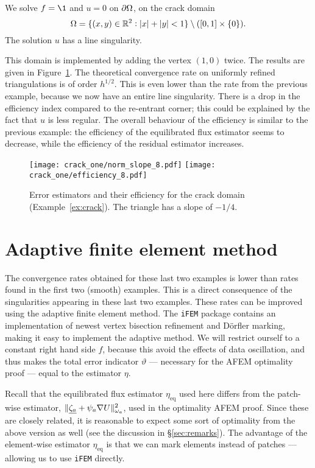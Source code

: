 \documentclass[thesis.tex]{subfiles}
\begin{document}
\begin{exmp}
  \label{ex:crack}
  We solve $f = \1$ and $u = 0$ on $\partial \Omega$, on the crack domain
  \[
  \Omega=\{(x,y) \in \mathbb{R}^2 : |x|+|y|<1\}\setminus ([0,1] \times \set{0}).
  \]
The solution $u$ has a line singularity.
\end{exmp}
This domain is implemented by adding the vertex $(1,0)$ twice.  
The results are given in Figure~\ref{fig:crackone}.
The theoretical convergence rate on uniformly refined triangulations is of order $h^{1/2}$. This is even lower than the
rate from the previous example, because we now have an entire line singularity.
There is a drop in the efficiency index compared to the re-entrant corner; this could
be explained by the fact that $u$ is less regular. The overall behaviour of the efficiency is similar
to the previous example: the efficiency of the equilibrated flux estimator seems to decrease, 
while the efficiency of the residual estimator increases.
\begin{figure}
  \centering
  \texttt{[image: crack\_one/norm\_slope\_8.pdf]}
  \texttt{[image: crack\_one/efficiency\_8.pdf]}
  \caption{Error estimators and their efficiency for the crack domain (Example~\ref{ex:crack}). The triangle has a slope of $-1/4$.}
  \label{fig:crackone}
\end{figure}

\section{Adaptive finite element method}
The convergence rates obtained for these last two examples is lower than rates found in the first
two (smooth) examples. This is a direct consequence of the singularities appearing in these last two examples.
These rates can be improved using the adaptive finite element method. The \texttt{iFEM} package contains
an implementation of newest vertex bisection refinement and D\"orfler marking, making it easy
to implement the adaptive method. We will restrict ourself to a constant right hand side $f$, because this
avoid the effects of data oscillation, and thus makes the total error indicator $\vartheta$ --- necessary for the AFEM optimality proof ---
equal to the estimator $\eta$. 

Recall that the equilibrated flux estimator $\eta_{\text{eq}}$ used here differs from the patch-wise estimator, 
$\| \underline{\zeta_a} + \psi_a \nabla U \|^2_{\omega_a}$, used in the optimality AFEM proof.
Since these are closely related, it is reasonable to expect some sort of optimality from the above version as well 
(see the discussion in \S\ref{sec:remarks}). The advantage of the element-wise estimator $\eta_{\text{eq}}$ is that
we can mark elements instead of patches --- allowing us to use \texttt{iFEM} directly. 
\end{document}

